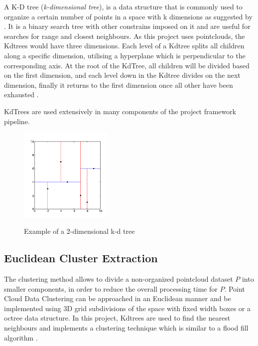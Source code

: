 \documentclass[12pt]{report}
\begin{document}
A K-D tree (\textit{k-dimensional tree}), is a data structure that is commonly used  to organize a certain number of points in a space with k dimensions as suggested by .
It is a binary search tree with other constrains imposed on it and are useful for searches for range and closest neighbours.
As this project uses pointclouds, the Kdtrees would have three dimensions. Each level of a Kdtree splits all children along a specific dimension, utilising a hyperplane which is perpendicular to the corresponding axis. 
At the root of the KdTree, all children will be divided based on the first dimension, and each level down in the Kdtree divides on the next dimension, finally it returns to the first dimension once 
all other have been exhausted .

KdTrees are used extensively in many components of the project framework pipeline.
\begin{figure}[H]%
  \centering
  \includegraphics[width=0.4\textwidth]{2d_kdtree.png}
 \caption{Example of a 2-dimensional k-d tree}\cite[]{Rusu_ICRA2011_PCL}
 \label{fig:kdtree} 
\end{figure}

\subsection{Euclidean Cluster Extraction}

The clustering method allows to divide a non-organized pointcloud dataset \textbf{$P$} into smaller components, in order to reduce the overall processing time for \textbf{$P$}.
Point Cloud Data Clustering can be approached in an Euclidean manner and be implemented using 3D grid subdivisions of the space with fixed width boxes or a octree data structure.
In this project, Kdtrees are used to find the nearest neighbours and implements a clustering technique which is similar to a flood fill algorithm .
\end{document}
